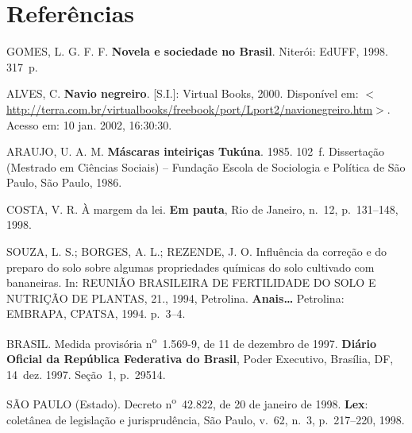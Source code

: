 %
%

\section{Referências}

\begingroup
\singlespacing
\setlength{\parskip}{\baselineskip}
\setlength{\parindent}{0pt}

GOMES, L. G. F. F. \textbf{Novela e sociedade no Brasil}. Niterói: EdUFF, 1998. 317~p.

ALVES, C. \textbf{Navio negreiro}. {[S.I.]}: Virtual Books, 2000. Disponível em:
$<$\url{http://terra.com.br/virtualbooks/freebook/port/Lport2/navionegreiro.htm}$>$.
Acesso em: 10 jan. 2002, 16:30:30.

ARAUJO, U. A. M. \textbf{Máscaras inteiriças Tukúna}. 1985. 102~f. Dissertação
(Mestrado em Ciências Sociais) -- Fundação Escola de Sociologia e Política de São Paulo,
São Paulo, 1986.

COSTA, V. R. À margem da lei. \textbf{Em pauta}, Rio de Janeiro, n.~12, p.~131--148, 1998.

SOUZA, L. S.; BORGES, A. L.; REZENDE, J. O. Influência da correção e do preparo do
solo sobre algumas propriedades químicas do solo cultivado com bananeiras. In: REUNIÃO
BRASILEIRA DE FERTILIDADE DO SOLO E NUTRIÇÃO DE PLANTAS, 21., 1994,
Petrolina. \textbf{Anais{\ldots}} Petrolina: EMBRAPA, CPATSA, 1994. p.~3--4.

BRASIL. Medida provisória n\textsuperscript{o}~1.569-9, de 11 de dezembro de 1997.
\textbf{Diário Oficial da República Federativa do Brasil}, Poder Executivo, Brasília, DF,
14~dez. 1997. Seção~1, p.~29514.

SÃO PAULO (Estado). Decreto n\textsuperscript{o}~42.822, de 20 de janeiro de 1998.
\textbf{Lex}: coletânea de legislação e jurisprudência, São Paulo, v.~62, n.~3,
p.~217--220, 1998.

\endgroup
